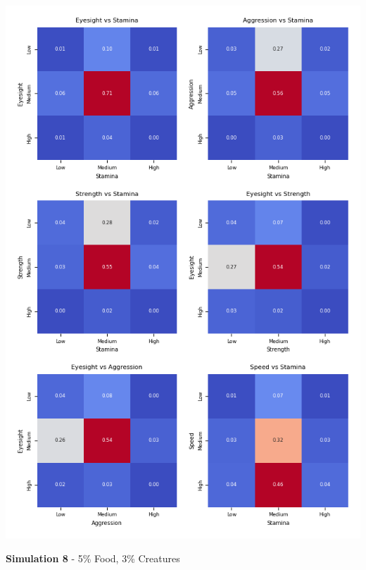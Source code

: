 \documentclass{article}
\begin{document}
\begin{center}
    \includegraphics[scale=0.9]{tests/7_confusion_matrices.png}
\end{center}
\textbf{Simulation 8} - 5\% Food, 3\% Creatures
\end{document}
